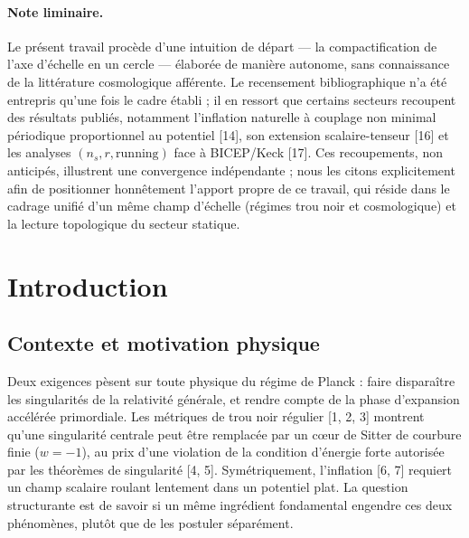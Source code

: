 \documentclass[11pt,a4paper]{article}
\newcommand{\statut}[1]{{\footnotesize\textsf{[#1]}}}
\theoremstyle{plain}
\theoremstyle{remark}
\begin{document}
\begin{abstract}
\smallskip\noindent\textit{Statut \'epist\'emique :} \statut{preuve} calcul formel exact $\cdot$
\statut{num\'erique} int\'egration reproductible $\cdot$ \statut{conjecture} plausible, non
prouv\'e $\cdot$ \statut{heuristique} analogie $\cdot$ \statut{sp\'eculation} ouvert $\cdot$
\statut{ouvert} \`a \'etablir $\cdot$ \statut{\`a v\'erifier} r\'ef.\ externe. Aucune conjecture
n'est pr\'esent\'ee comme un th\'eor\`eme.
\end{abstract}

\paragraph{Note liminaire.} Le pr\'esent travail proc\`ede d'une intuition de d\'epart ---
la compactification de l'axe d'\'echelle en un cercle --- \'elabor\'ee de mani\`ere autonome,
sans connaissance de la litt\'erature cosmologique aff\'erente. Le recensement
bibliographique n'a \'et\'e entrepris qu'une fois le cadre \'etabli ; il en ressort que
certains secteurs recoupent des r\'esultats publi\'es, notamment l'inflation naturelle \`a
couplage non minimal p\'eriodique proportionnel au potentiel [14], son extension
scalaire-tenseur [16] et les analyses $(n_s,r,\text{running})$ face \`a BICEP/Keck [17].
Ces recoupements, non anticip\'es, illustrent une convergence ind\'ependante ; nous les
citons explicitement afin de positionner honn\^etement l'apport propre de ce travail, qui
r\'eside dans le cadrage unifi\'e d'un m\^eme champ d'\'echelle (r\'egimes trou noir et
cosmologique) et la lecture topologique du secteur statique.

\section{Introduction}
\subsection{Contexte et motivation physique}
Deux exigences p\`esent sur toute physique du r\'egime de Planck : faire dispara\^itre les
singularit\'es de la relativit\'e g\'en\'erale, et rendre compte de la phase d'expansion
acc\'el\'er\'ee primordiale. Les m\'etriques de trou noir r\'egulier [1, 2, 3] montrent qu'une
singularit\'e centrale peut \^etre remplac\'ee par un c\oe ur de Sitter de courbure finie
($w=-1$), au prix d'une violation de la condition d'\'energie forte autoris\'ee par les
th\'eor\`emes de singularit\'e [4, 5]. Sym\'etriquement, l'inflation [6, 7] requiert un champ
scalaire roulant lentement dans un potentiel plat. La question structurante est de
savoir si un m\^eme ingr\'edient fondamental engendre ces deux ph\'enom\`enes, plut\^ot que de
les postuler s\'epar\'ement.
\end{document}
